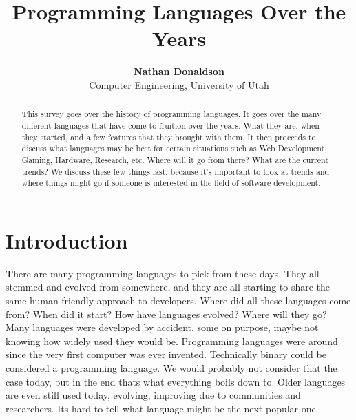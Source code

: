 \documentclass[letterpaper, 10 pt, conference]{IEEEtran}
\title{Programming Languages Over the Years}
\author{\textbf{Nathan Donaldson}\\
Computer Engineering, University of Utah}
\begin{document}
\maketitle 	
\makeatletter
\def\ps@headings{%
\def\@oddhead{\mbox{}\scriptsize\rightmark \hfil \thepage}%
\def\@evenhead{\scriptsize\thepage \hfil \leftmark\mbox{}}%
\def\@oddfoot{\scriptsize \@date\hfil PLOTY}%
\def\@evenfoot{\scriptsize PLOTY...\hfil \@date}}
\makeatother

\pagestyle{headings}

\begin{abstract}
This survey goes over the history of programming languages. It goes over the many different languages that have come to fruition over the years: What they are, when they started, and a few features that they brought with them. It then proceeds to discuss what languages may be best for certain situations such as Web Development, Gaming, Hardware, Research, etc. Where will it go from there? What are the current trends? We discuss these few things last, because it's important to look at trends and where things might go if someone is interested in the field of software development. 
\end{abstract}

\section{Introduction}
\lettrine[findent=2pt]{\textbf{T}}{}here are many programming languages to pick from these days. They all stemmed and evolved from somewhere, and they are all starting to share the same human friendly approach to developers. Where did all these languages come from? When did it start? How have languages evolved? Where will they go? Many languages were developed by accident, some on purpose, maybe not knowing how widely used they would be. Programming languages were around since the very first computer was ever invented. Technically binary could be considered a programming language. We would probably not consider that the case today, but in the end thats what everything boils down to. Older languages are even still used today, evolving, improving due to communities and researchers. Its hard to tell what language might be the next popular one. 
\end{document}
